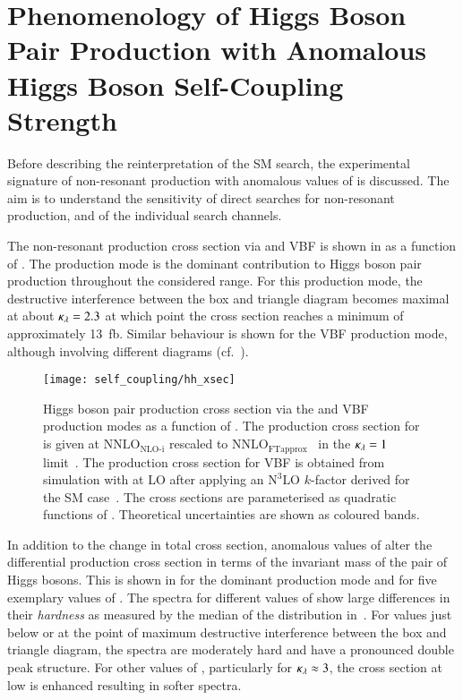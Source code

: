 \section{Phenomenology of Higgs Boson Pair Production with Anomalous
  Higgs Boson Self-Coupling Strength}%
\label{sec:self_coupling_pheno}

Before describing the reinterpretation of the SM \HH search, the
experimental signature of non-resonant \HH production with anomalous
values of \klambda is discussed. The aim is to understand the
sensitivity of direct searches for non-resonant \HH production, and of
the individual search channels.

The non-resonant \HH production cross section via \ggF and VBF is shown in
 as a function of \klambda. The \ggF production mode is
the dominant contribution to Higgs boson pair production throughout the
considered \klambda range. For this production mode, the destructive
interference between the box and triangle diagram becomes maximal at about
$\kappa_{\lambda} = 2.3$ at which point the cross section reaches a minimum of
approximately \SI{13}{\femto\barn}. Similar behaviour is shown for the VBF
production mode, although involving different diagrams (cf.\
).

\begin{figure}[htbp]
  \centering

  \texttt{[image: self\_coupling/hh\_xsec]}

  \caption{Higgs boson pair production cross section via the \ggF and
    VBF production modes as a function of \klambda. The production
    cross section for \ggF is given at $\text{NNLO}_{\text{NLO-i}}$
    rescaled to
    $\text{NNLO}_{\text{FTapprox}}$~\cite{Grazzini:2018bsd} in the
    $\kappa_{\lambda} = 1$
    limit~\cite{Amoroso:2020lgh,Baglio:2020wgt,LHCHWGHH}. The
    production cross section for VBF is obtained from simulation with
    \MGNLO at LO after applying an $\text{N}^3\text{LO}$ $k$-factor
    derived for the SM case~\cite{Dreyer:2018qbw,LHCHWGHH}. The cross
    sections are parameterised as quadratic functions of
    \klambda. Theoretical uncertainties are shown as coloured bands.}%
  \label{fig:hh_xsec_incl}
\end{figure}

In addition to the change in total cross section, anomalous values of
\klambda alter the differential \HH production cross section in terms
of the invariant mass of the pair of Higgs bosons. This is shown in
\Cref{fig:hh_xsec_mhh} for the dominant \ggF production mode and for
five exemplary values of \klambda. The \mHH spectra for different
values of \klambda show large differences in their \emph{hardness} as
measured by the median of the \mHH distribution
in~. For \klambda values just below or at the
point of maximum destructive interference between the box and triangle
diagram, the \mHH spectra are moderately hard and have a pronounced
double peak structure. For other values of \klambda, particularly for
$\kappa_{\lambda} \approx 3$, the cross section at low \mHH is enhanced
resulting in softer \mHH spectra.

